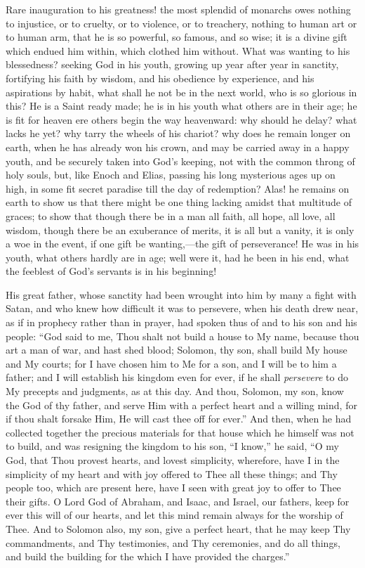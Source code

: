 Rare inauguration to his greatness! the most splendid of monarchs
owes nothing to injustice, or to cruelty, or to violence, or to
treachery, nothing to human art or to human arm, that he is so
powerful, so famous, and so wise; it is a divine gift which endued him
within, which clothed him without. What was wanting to his
blessedness? seeking God in his youth, growing up year after year in
sanctity, fortifying his faith by wisdom, and his obedience by
experience, and his aspirations by habit, what shall he not be in the
next world, who is so glorious in this? He is a Saint ready made; he
is in his youth what others are in their age; he is fit for heaven ere
others begin the way heavenward: why should he delay? what lacks he
yet? why tarry the wheels of his chariot? why does he remain longer on
earth, when he has already won his crown, and may be carried away in a
happy youth, and be securely taken into God's keeping, not with the
common throng of holy souls, but, like Enoch and Elias, passing his
long mysterious ages up on high, in some fit secret paradise till the
day of redemption? Alas! he remains on earth to show us that there
might be one thing lacking amidst that multitude of graces; to show
that though there be in a man all faith, all hope, all love, all wisdom, though there be an exuberance of merits, it is all but a
vanity, it is only a woe in the event, if one gift be wanting,—the
gift of perseverance! He was in his youth, what others hardly are in
age; well were it, had he been in his end, what the feeblest of God's
servants is in his beginning!

His great father, whose sanctity had been wrought into him by many
a fight with Satan, and who knew how difficult it was to persevere,
when his death drew near, as if in prophecy rather than in prayer, had
spoken thus of and to his son and his people: ``God said to me,
Thou shalt not build a house to My name, because thou art a man of
war, and hast shed blood; Solomon, thy son, shall build My house and
My courts; for I have chosen him to Me for a son, and I will be to him
a father; and I will establish his kingdom even for ever, if he shall \emph{persevere}
to do My precepts and judgments, as at this day. And thou, Solomon, my
son, know the God of thy father, and serve Him with a perfect heart
and a willing mind, for if thou shalt forsake Him, He will cast thee
off for ever.'' And then, when he had collected together the
precious materials for that house which he himself was not to build,
and was resigning the kingdom to his son, ``I know,'' he said,
``O my God, that Thou provest hearts, and lovest simplicity,
wherefore, have I in the simplicity of my heart and with joy offered
to Thee all these things; and Thy people too, which are present here,
have I seen with great joy to offer to Thee their gifts. O Lord God of
Abraham, and Isaac, and Israel, our fathers, keep for ever this will
of our hearts, and let this mind remain always for the worship of
Thee. And to Solomon also, my son, give a perfect heart, that he may
keep Thy commandments, and Thy testimonies, and Thy ceremonies, and do
all things, and build the building for the which I have provided the
charges.''

